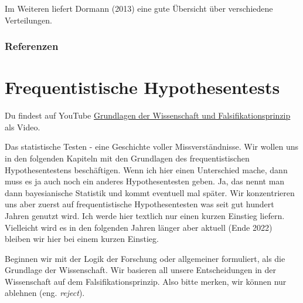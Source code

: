 \documentclass[
  letterpaper,
]{scrbook}
\begin{document}
Im Weiteren liefert Dormann (2013) eine gute Übersicht über verschiedene
Verteilungen.

\hypertarget{referenzen-2}{%
\section*{Referenzen}\label{referenzen-2}}

\part{Frequentistische Hypothesentests}

\begin{tcolorbox}[enhanced jigsaw, coltitle=black, titlerule=0mm, bottomrule=.15mm, opacityback=0, opacitybacktitle=0.6, leftrule=.75mm, title=\textcolor{quarto-callout-tip-color}{\faLightbulb}\hspace{0.5em}{Grundlagen der Wissenschaft und Falsifikationsprinzip}, toprule=.15mm, bottomtitle=1mm, toptitle=1mm, left=2mm, breakable, arc=.35mm, colback=white, rightrule=.15mm, colbacktitle=quarto-callout-tip-color!10!white, colframe=quarto-callout-tip-color-frame]
Du findest auf YouTube \href{https://youtu.be/h45ftLNsspM}{Grundlagen
der Wissenschaft und Falsifikationsprinzip} als Video.
\end{tcolorbox}

Das statistische Testen - eine Geschichte voller Missverständnisse. Wir
wollen uns in den folgenden Kapiteln mit den Grundlagen des
frequentistischen Hypothesentestens beschäftigen. Wenn ich hier einen
Unterschied mache, dann muss es ja auch noch ein anderes
Hypothesentesten geben. Ja, das nennt man dann bayesianische Statistik
und kommt eventuell mal später. Wir konzentrieren uns aber zuerst auf
frequentistische Hypothesentesten was seit gut hundert Jahren genutzt
wird. Ich werde hier textlich nur einen kurzen Einstieg liefern.
Vielleicht wird es in den folgenden Jahren länger aber aktuell (Ende
2022) bleiben wir hier bei einem kurzen Einstieg.

{}

Beginnen wir mit der Logik der Forschung oder allgemeiner formuliert,
als die Grundlage der Wissenschaft. Wir basieren all unsere
Entscheidungen in der Wissenschaft auf dem Falsifikationsprinzip. Also
bitte merken, wir können nur ablehnen (eng. \emph{reject}).
\end{document}
